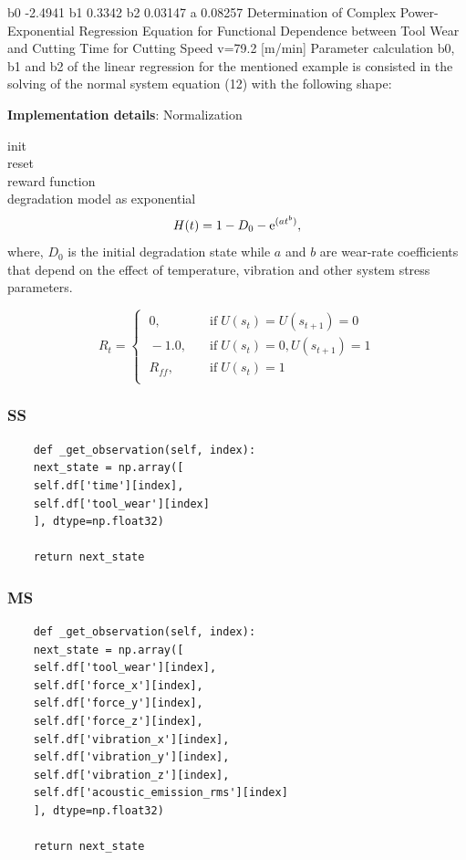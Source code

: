 \documentclass[a4paper, 12pt]{article}
\begin{document}
b0	-2.4941	
b1	0.3342	
b2	0.03147	
a	0.08257	
Determination of Complex Power-
Exponential Regression Equation for
Functional Dependence between Tool Wear
and Cutting Time for
Cutting Speed v=79.2 [m/min]
Parameter calculation b0, b1 and b2 of the linear
regression for the mentioned example is consisted in
the solving of the normal system equation (12) with
the following shape:



\textbf{Implementation details}: Normalization

init \\
reset \\
reward function \\

degradation model as exponential
\begin{equation}\label{eq:DegradationModel}
	H(t) = 1 - D_0 - {\rm e}^{(at^b)},
\end{equation}
where, $D_0$ is the initial degradation state while $a$ and $b$ are wear-rate coefficients that depend on the effect of temperature, vibration and other system stress parameters.

\begin{equation}
	R_t =
	\begin{cases}
		\; 0, &  \quad \text{if}\; U(s_t) = U(s_{t+1}) = 0 \\
		\; -1.0, & \quad \text{if}\; U(s_t) = 0, U(s_{t+1}) = 1 \\
		\; R_{ff}, & \quad \text{if}\; U(s_t) = 1\\
	\end{cases}
	\label{eq:RewardFunction}
\end{equation}

\subsubsection{SS}
\begin{verbatim}
	def _get_observation(self, index):
	next_state = np.array([
	self.df['time'][index],
	self.df['tool_wear'][index]
	], dtype=np.float32)
	
	return next_state
\end{verbatim}

\subsubsection{MS}
\begin{verbatim}
	def _get_observation(self, index):
	next_state = np.array([
	self.df['tool_wear'][index],
	self.df['force_x'][index],
	self.df['force_y'][index],
	self.df['force_z'][index],
	self.df['vibration_x'][index],
	self.df['vibration_y'][index],
	self.df['vibration_z'][index],
	self.df['acoustic_emission_rms'][index]
	], dtype=np.float32)
	
	return next_state
\end{verbatim}
\end{document}
